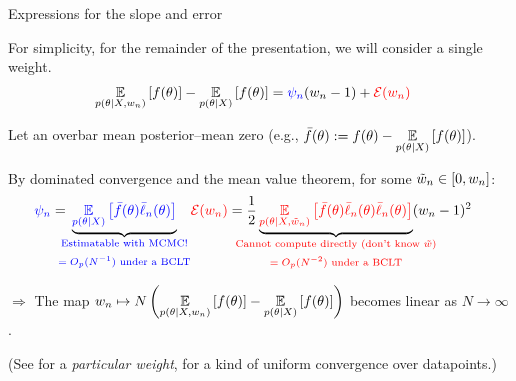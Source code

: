 

    


\begin{frame}[t]{Expressions for the slope and error}


For simplicity, for the remainder of the presentation, we will
consider a single weight.
%
\begin{align*}
%
\expect{p(\theta \vert \xvec, \w_n)}{f(\theta)} -
    \expect{p(\theta \vert \xvec)}{f(\theta)} ={}&
    \blue{\infl_n} (\w_n - 1) + \red{\err(\w_n)}
%
\end{align*}
%

Let an overbar mean posterior--mean zero
(e.g., $\bar{f}(\theta) := f(\theta) - \underset{p(\theta \vert X)}{\mathbb{E}}\left[f(\theta)\right]$).

By dominated convergence and the mean value theorem, for some $\tilde{w}_n \in [0,w_n]$:
%
\begin{align*}
%
\blue{\infl_n} ={}&
\undernote{\blue{
    \expect{\p(\theta \vert \xvec)}{ \thetabar \ellbar_n(\theta)}
}}{\blue{\substack{
    \text{Estimatable with MCMC!} \\
    \text{\,}\\
    \text{$= O_p(N^{-1})$ under a BCLT}
}}}
&
\red{\err(\w_n)} ={}&
\frac{1}{2}
\undernote{
    \red{\expect{\p(\theta \vert \xvec, \wtil_n)}{
        \thetabar
        \ellbar_n(\theta)
        \ellbar_n(\theta)}}
}
{\red{\substack{
    \text{Cannot compute directly (don't know $\wtil$)} \\ 
    \text{\,}\\
    \text{$= O_p(N^{-2})$ under a BCLT}
}}}
(\w_n - 1)^2
%
\end{align*}
%

$\Rightarrow $
The map $w_n \mapsto N \left( \underset{p(\theta \vert X, w_n)}{\mathbb{E}}\left[f(\theta)\right] -
\underset{p(\theta \vert X)}{\mathbb{E}}\left[f(\theta)\right] \right)$ becomes linear as $N
\rightarrow \infty$.

(See \citep{kass:1990:posteriorexpansions} for a \textit{particular weight},
\citep{giordano:2023:bayesij} for a kind of uniform convergence over datapoints.)


\end{frame}
